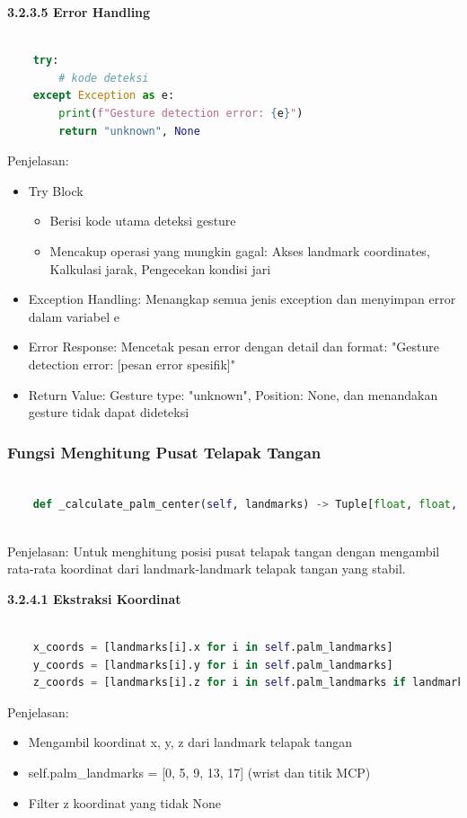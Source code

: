 \documentclass[11pt,a4paper]{article}
\begin{document}
    \noindent\textbf{3.2.3.5 Error Handling}
    \begin{lstlisting}[language=Python, caption=Error Handling]
        
    try:
        # kode deteksi
    except Exception as e:
        print(f"Gesture detection error: {e}")
        return "unknown", None
    \end{lstlisting}
    Penjelasan:
    \begin{itemize}
        \item  Try Block
        \begin{itemize}
            \item Berisi kode utama deteksi gesture
            \item Mencakup operasi yang mungkin gagal: Akses landmark coordinates, Kalkulasi jarak, Pengecekan kondisi jari
        \end{itemize}
        \item  Exception Handling: Menangkap semua jenis exception dan menyimpan error dalam variabel e
        \item Error Response: Mencetak pesan error dengan detail dan format: "Gesture detection error: [pesan error spesifik]"
        \item Return Value: Gesture type: "unknown", Position: None, dan menandakan gesture tidak dapat dideteksi
    \end{itemize}
    
    \subsubsection{Fungsi Menghitung Pusat Telapak Tangan}
    \begin{lstlisting}[language=Python, caption=Menghitung Pusat Telapak Tangan]

    def _calculate_palm_center(self, landmarks) -> Tuple[float, float, float]:
    
    \end{lstlisting}
    Penjelasan:
    Untuk menghitung posisi pusat telapak tangan dengan mengambil rata-rata koordinat dari landmark-landmark telapak tangan yang stabil.

    \noindent\textbf{3.2.4.1 Ekstraksi Koordinat}
    \begin{lstlisting}[language=Python, caption=Ekstraksi Koordinat]
        
    x_coords = [landmarks[i].x for i in self.palm_landmarks]
    y_coords = [landmarks[i].y for i in self.palm_landmarks]
    z_coords = [landmarks[i].z for i in self.palm_landmarks if landmarks[i].z is not None]
    \end{lstlisting}
    Penjelasan: 
    \begin{itemize}
        \item Mengambil koordinat x, y, z dari landmark telapak tangan
        \item self.palm_landmarks = [0, 5, 9, 13, 17] (wrist dan titik MCP)
        \item Filter z koordinat yang tidak None
    \end{itemize}
\end{document}
